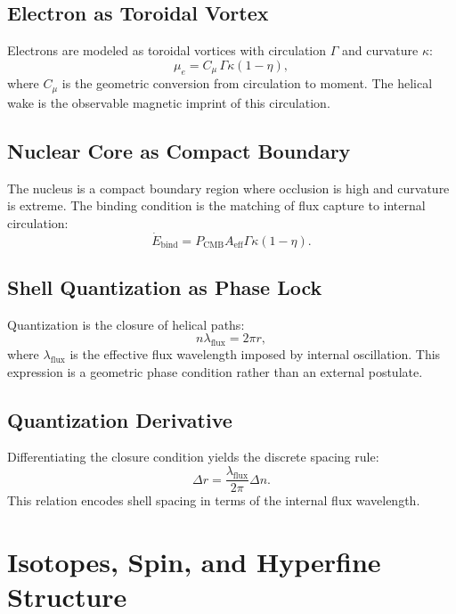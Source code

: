 \documentclass[12pt]{book}
\begin{document}
\section{Electron as Toroidal Vortex}
Electrons are modeled as toroidal vortices with circulation $\Gamma$ and curvature $\kappa$:
\begin{equation}
\mu_e = C_\mu\, \Gamma \kappa (1-\eta),
\end{equation}
where $C_\mu$ is the geometric conversion from circulation to moment. The helical wake is the observable
magnetic imprint of this circulation.

\section{Nuclear Core as Compact Boundary}
The nucleus is a compact boundary region where occlusion is high and curvature is extreme. The binding
condition is the matching of flux capture to internal circulation:
\begin{equation}
\dot{E}_{\text{bind}} = P_{\text{CMB}} A_{\text{eff}} \Gamma \kappa (1-\eta).
\end{equation}

\section{Shell Quantization as Phase Lock}
Quantization is the closure of helical paths:
\begin{equation}
n \lambda_{\text{flux}} = 2\pi r,
\end{equation}
where $\lambda_{\text{flux}}$ is the effective flux wavelength imposed by internal oscillation. This
expression is a geometric phase condition rather than an external postulate.

\section{Quantization Derivative}
Differentiating the closure condition yields the discrete spacing rule:
\begin{equation}
\Delta r = \frac{\lambda_{\text{flux}}}{2\pi}\Delta n.
\end{equation}
This relation encodes shell spacing in terms of the internal flux wavelength.

\chapter{Isotopes, Spin, and Hyperfine Structure}
\end{document}
